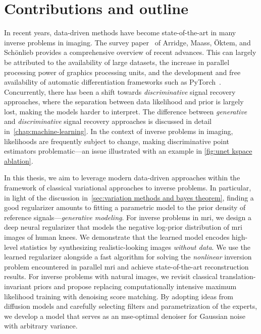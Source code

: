 \section{Contributions and outline}
In recent years, data-driven methods have become state-of-the-art in many inverse problems in imaging.
The survey paper~\cite{Arridge_Maass_Öktem_Schönlieb_2019} of Arridge, Maass, Öktem, and Schönlieb provides a comprehensive overview of recent advances.
This can largely be attributed to the availability of large datasets, the increase in parallel processing power of graphics processing units, and the development and free availability of automatic differentiation frameworks such as PyTorch~\cite{paszke_pytorch_2019}.
Concurrently, there has been a shift towards \emph{discriminative} signal recovery approaches, where the separation between data likelihood and prior is largely lost, making the models harder to interpret.
The difference between \emph{generative} and \emph{discriminative} signal recovery approaches is discussed in detail in~\cref{chap:machine-learning}.
In the context of inverse problems in imaging, likelihoods are frequently subject to change, making discriminative point estimators problematic---an issue illustrated with an example in \cref{fig:unet kspace ablation}.

In this thesis, we aim to leverage modern data-driven approaches within the framework of classical variational approaches to inverse problems.
In particular, in light of the discussion in~\cref{sec:variation methods and bayes theorem}, finding a good regularizer amounts to fitting a parametric model to the prior density of reference signals---\emph{generative modeling}.
For inverse problems in \gls{mri}, we design a deep neural regularizer that models the negative log-prior distribution of \gls{mri} images of human knees.
We demonstrate that the learned model encodes high-level statistics by synthesizing realistic-looking images \emph{without data}.
We use the learned regularizer alongside a fast algorithm for solving the \emph{nonlinear} inversion problem encountered in parallel \gls{mri} and achieve state-of-the-art reconstruction results.
For inverse problems with natural images, we revisit classical translation-invariant priors and propose replacing computationally intensive maximum likelihood training with denoising score matching.
By adopting ideas from diffusion models and carefully selecting filters and parametrization of the experts, we develop a model that serves as an \gls{mse}-optimal denoiser for Gaussian noise with arbitrary variance.

